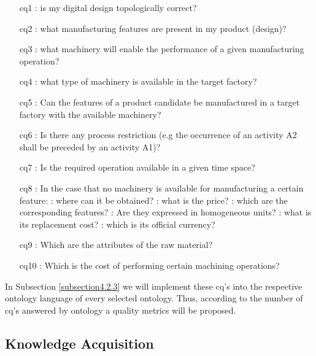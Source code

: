 \begin{itemize}
	\item [\gls{cq}1]: is my digital design topologically correct?
	\item [\gls{cq}2]: what manufacturing features are present in my product (design)?
	\item [\gls{cq}3]: what machinery will enable the performance of a given manufacturing operation?
	\item [\gls{cq}4]: what type of machinery is available in the target factory?
	\item [\gls{cq}5]: Can the features of a product candidate be manufactured in a target factory with the available machinery?
	\item [\gls{cq}6]: Is there any process restriction (e.g the occurrence of an activity A2   shall be preceded by an activity A1)?
	\item [\gls{cq}7]: Is the required operation available in a given time space?
	\item [\gls{cq}8]: In the case that no machinery is available for manufacturing a certain feature:
	\subitem[\gls{cq}8.1]: where can it be obtained? 
	\subitem[\gls{cq}8.2]: what is the price?
	\subitem[\gls{cq}8.3]: which are the corresponding features?
	\subitem[\gls{cq}8.4]: Are they expressed in homogeneous units?
	\subitem[\gls{cq}8.5]: what is its replacement cost?
	\subitem[\gls{cq}8.6]: which is its official currency?  
	\item [\gls{cq}9]: Which are the attributes of the raw material?
	\item [\gls{cq}10]: Which is the cost of performing certain machining operations? 
	
\end{itemize}

In Subsection \ref{subsection4.2.3} we will implement these \gls{cq}'s into the respective ontology language of every selected ontology. Thus, according to the number of \gls{cq}'s answered by ontology a quality metrics will be proposed.


\subsection{Knowledge Acquisition}\label{4.1.3}

